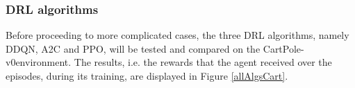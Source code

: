 \newpage


\subsubsection{\acrfull{DRL} algorithms}

Before proceeding to more complicated cases, the three \gls{DRL} algorithms, namely \gls{DDQN}, \gls{A2C} and \gls{PPO}, will be tested and compared on the CartPole-v0\footnotemark environment. The results, i.e. the rewards that the agent received over the episodes, during its training, are displayed in Figure \ref{allAlgsCart}.\\


